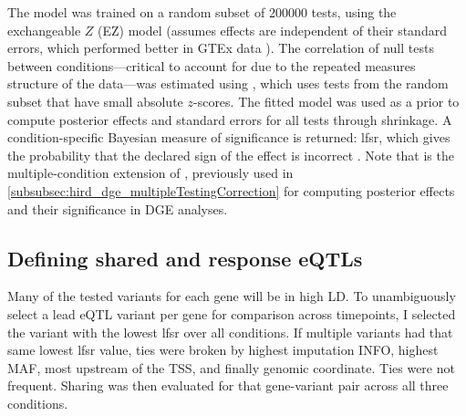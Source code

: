 
The  model was trained on a random subset of \num{200000} tests, using the exchangeable $Z$ (EZ) model (assumes effects are independent of their standard errors, which performed better in GTEx data \autocite{urbut2018FlexibleStatisticalMethods}).
The correlation of null tests between conditions---critical to account for due to the repeated measures structure of the data---was estimated using , which uses tests from the random subset that have small absolute $z$-scores.
The fitted model was used as a prior to compute posterior effects and standard errors for all tests through shrinkage.
A condition-specific Bayesian measure of significance is returned:
\gls{lfsr}, which gives the probability that the declared sign of the effect is incorrect \autocite{stephens2016FalseDiscoveryRates}.
Note that  is the multiple-condition extension of  \autocite{stephens2016FalseDiscoveryRates}, 
previously used in \cref{subsubsec:hird_dge_multipleTestingCorrection} for computing posterior effects and their significance in \gls{DGE} analyses.

\subsection{Defining shared and response eQTLs}
\label{subsec:hird_reQTL_methods_definingSharedAndreQTLs}

Many of the tested variants for each gene will be in high \gls{LD}.
To unambiguously select a lead \gls{eQTL} variant per gene for comparison across timepoints, I selected the variant with the lowest \gls{lfsr} over all conditions.
If multiple variants had that same lowest \gls{lfsr} value,
ties were broken by highest imputation INFO, highest \gls{MAF}, most upstream of the \gls{TSS}, and finally genomic coordinate.
Ties were not frequent.
Sharing was then evaluated for that gene-variant pair across all three conditions.

